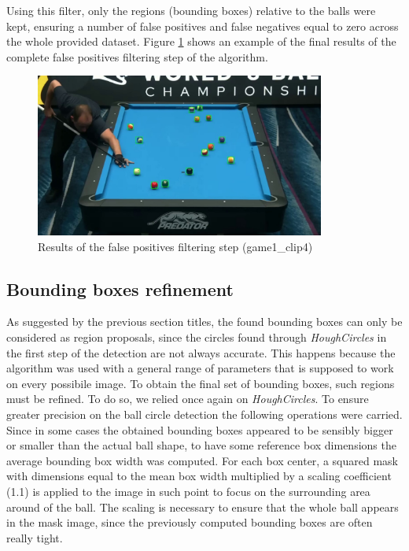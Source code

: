 Using this filter, only the regions (bounding boxes) relative to the balls were kept, ensuring a number of false positives and false
negatives equal to zero across the whole provided dataset. Figure \ref{fig:filtering} shows an example of the final results of the complete false positives filtering step of the algorithm.
\begin{figure}[h!]
    \centering
    \includegraphics[width=0.85\textwidth]{imgs/ball_localization/filtered_bboxes.jpg}
    \caption{Results of the false positives filtering step (game1\_clip4)}
    \label{fig:filtering}
\end{figure}


\subsection{Bounding boxes refinement}
As suggested by the previous section titles, the found bounding boxes can only be considered as region proposals, since the circles
found through \textit{HoughCircles} in the first step of the detection are not always accurate. This happens because the algorithm was used with a general range of parameters that is supposed to work 
on every possibile image. To obtain the final set of bounding boxes, such regions must be refined.
To do so, we relied once again on \textit{HoughCircles}. To ensure greater precision on the ball circle detection the following operations were carried.
Since in some cases the obtained bounding boxes appeared to be sensibly bigger or smaller than the actual ball shape, to have some reference box dimensions the average
bounding box width was computed. For each box center, a squared mask with dimensions equal to the mean box width multiplied by a scaling coefficient (1.1) is applied to 
the image in such point to focus on the surrounding area around of the ball. The scaling is necessary to ensure that the whole ball appears in the mask image, since the previously computed bounding
boxes are often really tight.

